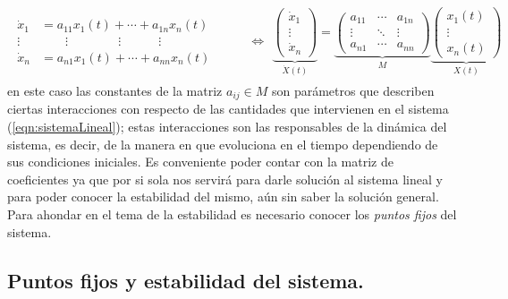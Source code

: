 \begin{align*}
	\begin{split}
			\dot{x}_1 &= a_{11}x_1(t)+\cdots+a_{1n}x_n(t)             \\
			\vdots &\qquad \vdots\qquad\qquad\vdots\qquad\quad\vdots  \\
			\dot{x}_n &= a_{n1}x_1(t)+\cdots+a_{nn}x_n(t)             
	\end{split}	          
	\qquad\ \ \, \Longleftrightarrow
	\begin{split}
		\underbrace{\begin{pmatrix}
				\dot{x}_1\\
				\vdots\\
				\dot{x}_n
		\end{pmatrix}}_{\dot{X}(t)}=\underbrace{\begin{pmatrix}
				a_{11} & \cdots & a_{1n}\\
				\vdots & \ddots & \vdots\\
				a_{n1} & \cdots & a_{nn}
		\end{pmatrix}}_{M}\underbrace{\begin{pmatrix}
		x_1(t)\\
		\vdots\\
		x_n(t)
	\end{pmatrix}}_{X(t)}
	\end{split} 
\end{align*}
en este caso las constantes de la matriz $a_{ij}\in M$ son parámetros que describen ciertas interacciones con respecto de las cantidades que intervienen en el sistema (\ref{eqn:sistemaLineal}); estas interacciones son las responsables de la dinámica del sistema, es decir, de la manera en que evoluciona en el tiempo dependiendo de sus condiciones iniciales. Es conveniente poder contar con la matriz de coeficientes ya que por si sola nos servirá para darle solución al sistema lineal y para poder conocer la estabilidad del mismo, aún sin saber la solución general. Para ahondar en el tema de la estabilidad es necesario conocer los \textit{puntos fijos} del sistema.




\subsection{Puntos fijos y estabilidad del sistema.}


